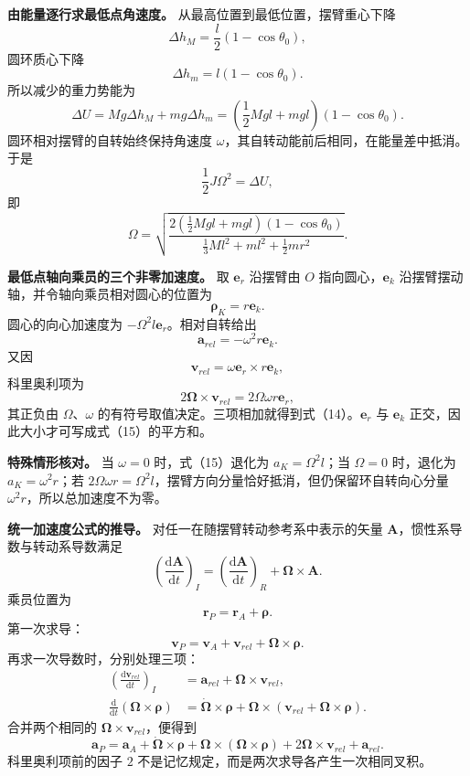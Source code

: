 \documentclass[12pt,a4paper,UTF8]{ctexart}
\begin{document}
\textbf{由能量逐行求最低点角速度。} 从最高位置到最低位置，摆臂重心下降
\[
\Delta h_M=\frac l2(1-\cos\theta_0),
\] 圆环质心下降 \[
\Delta h_m=l(1-\cos\theta_0).
\] 所以减少的重力势能为 \[
\Delta U
=Mg\Delta h_M+mg\Delta h_m
=\left(\frac12Mgl+mgl\right)(1-\cos\theta_0).
\] 圆环相对摆臂的自转始终保持角速度
\(\omega\)，其自转动能前后相同，在能量差中抵消。于是 \[
\frac12J\Omega^2=\Delta U,
\] 即 \[
\Omega=\sqrt{
\frac{2\left(\frac12Mgl+mgl\right)(1-\cos\theta_0)}
{\frac13Ml^2+ml^2+\frac12mr^2}}
.
\]

\textbf{最低点轴向乘员的三个非零加速度。} 取 \(\boldsymbol e_r\)
沿摆臂由 \(O\) 指向圆心，\(\boldsymbol e_k\)
沿摆臂摆动轴，并令轴向乘员相对圆心的位置为 \[
\boldsymbol\rho_K=r\boldsymbol e_k.
\] 圆心的向心加速度为 \(-\Omega^2l\boldsymbol e_r\)。相对自转给出 \[
\boldsymbol a_{rel}=-\omega^2r\boldsymbol e_k.
\] 又因 \[
\boldsymbol v_{rel}
=\omega\boldsymbol e_r\times r\boldsymbol e_k,
\] 科里奥利项为 \[
2\boldsymbol\Omega\times\boldsymbol v_{rel}
=2\Omega\omega r\boldsymbol e_r,
\] 其正负由 \(\Omega\)、\(\omega\)
的有符号取值决定。三项相加就得到式（14）。\(\boldsymbol e_r\) 与
\(\boldsymbol e_k\) 正交，因此大小才可写成式（15）的平方和。

\textbf{特殊情形核对。} 当 \(\omega=0\) 时，式（15）退化为
\(a_K=\Omega^2l\)；当 \(\Omega=0\) 时，退化为 \(a_K=\omega^2r\)；若
\(2\Omega\omega r=\Omega^2l\)，摆臂方向分量恰好抵消，但仍保留环自转向心分量
\(\omega^2r\)，所以总加速度不为零。

\textbf{统一加速度公式的推导。} 对任一在随摆臂转动参考系中表示的矢量
\(\boldsymbol A\)，惯性系导数与转动系导数满足 \[
\left(\frac{\mathrm d\boldsymbol A}{\mathrm dt}\right)_{\!I}
=
\left(\frac{\mathrm d\boldsymbol A}{\mathrm dt}\right)_{\!R}
+\boldsymbol\Omega\times\boldsymbol A.
\] 乘员位置为 \[
\boldsymbol r_P=\boldsymbol r_A+\boldsymbol\rho.
\] 第一次求导： \[
\boldsymbol v_P
=\boldsymbol v_A+\boldsymbol v_{rel}
+\boldsymbol\Omega\times\boldsymbol\rho.
\] 再求一次导数时，分别处理三项： \[
\begin{aligned}
\left(\frac{\mathrm d\boldsymbol v_{rel}}{\mathrm dt}\right)_{\!I}
&=\boldsymbol a_{rel}
+\boldsymbol\Omega\times\boldsymbol v_{rel},\\
\frac{\mathrm d}{\mathrm dt}
(\boldsymbol\Omega\times\boldsymbol\rho)
&=\dot{\boldsymbol\Omega}\times\boldsymbol\rho
+\boldsymbol\Omega\times
\left(\boldsymbol v_{rel}
+\boldsymbol\Omega\times\boldsymbol\rho\right).
\end{aligned}
\] 合并两个相同的 \(\boldsymbol\Omega\times\boldsymbol v_{rel}\)，便得到
\[
\boldsymbol a_P
=\boldsymbol a_A
+\dot{\boldsymbol\Omega}\times\boldsymbol\rho
+\boldsymbol\Omega\times
(\boldsymbol\Omega\times\boldsymbol\rho)
+2\boldsymbol\Omega\times\boldsymbol v_{rel}
+\boldsymbol a_{rel}.
\] 科里奥利项前的因子 \(2\)
不是记忆规定，而是两次求导各产生一次相同叉积。
\end{document}
